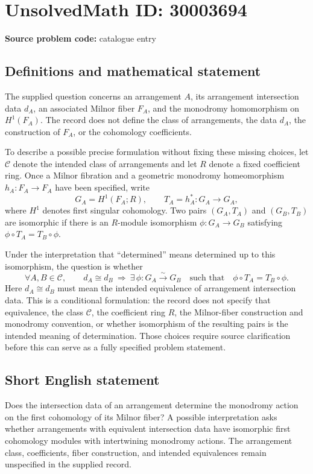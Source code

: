 \documentclass[11pt]{article}
\begin{document}
\section*{UnsolvedMath ID: 30003694}
\textbf{Source problem code:} catalogue entry
\subsection{Definitions and mathematical statement}
The supplied question concerns an arrangement \(A\), its arrangement intersection data \(d_A\), an associated Milnor fiber \(F_A\), and the monodromy homomorphism on \(H^1(F_A)\). The record does not define the class of arrangements, the data \(d_A\), the construction of \(F_A\), or the cohomology coefficients.

To describe a possible precise formulation without fixing these missing choices, let \(\mathcal C\) denote the intended class of arrangements and let \(R\) denote a fixed coefficient ring. Once a Milnor fibration and a geometric monodromy homeomorphism \(h_A:F_A\to F_A\) have been specified, write
\[
G_A=H^1(F_A;R),\qquad T_A=h_A^*:G_A\longrightarrow G_A,
\]
where \(H^1\) denotes first singular cohomology. Two pairs \((G_A,T_A)\) and \((G_B,T_B)\) are isomorphic if there is an \(R\)-module isomorphism \(\phi:G_A\to G_B\) satisfying \(\phi\circ T_A=T_B\circ\phi\).

Under the interpretation that ``determined'' means determined up to this isomorphism, the question is whether
\[
\forall A,B\in\mathcal C,\qquad
 d_A\cong d_B
 \ \Longrightarrow\ 
 \exists\,\phi:G_A\xrightarrow{\sim}G_B
 \quad\text{such that}\quad
 \phi\circ T_A=T_B\circ\phi.
\]
Here \(d_A\cong d_B\) must mean the intended equivalence of arrangement intersection data. This is a conditional formulation: the record does not specify that equivalence, the class \(\mathcal C\), the coefficient ring \(R\), the Milnor-fiber construction and monodromy convention, or whether isomorphism of the resulting pairs is the intended meaning of determination. Those choices require source clarification before this can serve as a fully specified problem statement.
\subsection{Short English statement}
Does the intersection data of an arrangement determine the monodromy action on the first cohomology of its Milnor fiber? A possible interpretation asks whether arrangements with equivalent intersection data have isomorphic first cohomology modules with intertwining monodromy actions. The arrangement class, coefficients, fiber construction, and intended equivalences remain unspecified in the supplied record.
\end{document}
